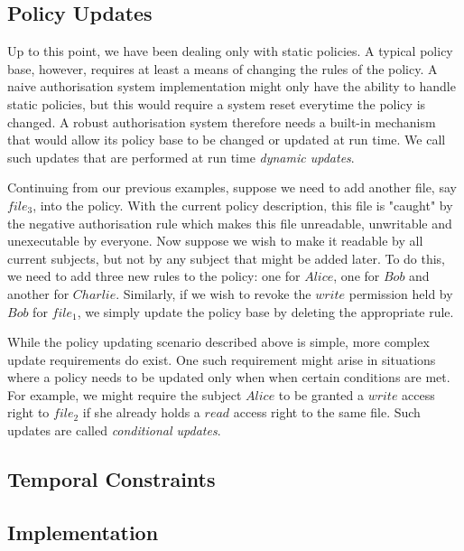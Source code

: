 \documentclass[11pt]{report}
\begin{document}
      \subsection{Policy Updates}

        Up to this point, we have been dealing only with static policies. A
        typical policy base, however, requires at least a means of changing
        the rules of the policy. A naive authorisation system implementation
        might only have the ability to handle static policies, but this would
        require a system reset everytime the policy is changed. A robust
        authorisation system therefore needs a built-in mechanism that would
        allow its policy base to be changed or updated at run time. We call
        such updates that are performed at run time {\em dynamic updates}.

        Continuing from our previous examples, suppose we need to add another
        file, say $file_3$, into the policy. With the current policy
        description, this file is "caught" by the negative authorisation rule
        which makes this file unreadable, unwritable and unexecutable by
        everyone. Now suppose we wish to make it readable by all current
        subjects, but not by any subject that might be added later. To do this,
        we need to add three new rules to the policy: one for $Alice$, one for
        $Bob$ and another for $Charlie$. Similarly, if we wish to revoke
        the $write$ permission held by $Bob$ for $file_1$, we simply update
        the policy base by deleting the appropriate rule.

        While the policy updating scenario described above is simple, more
        complex update requirements do exist. One such requirement might arise
        in situations where a policy needs to be updated only when when certain
        conditions are met. For example, we might require the subject $Alice$
        to be granted a $write$ access right to $file_2$ if she already holds
        a $read$ access right to the same file. Such updates are called
        {\em conditional updates}.

      \subsection{Temporal Constraints}

      \subsection{Implementation}
\end{document}
